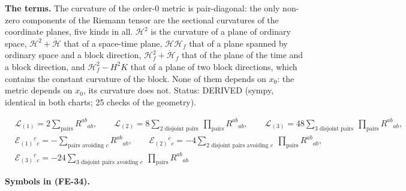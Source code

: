 \documentclass[
  10pt,
]{article}
\begin{document}
\textbf{The terms.} The curvature of the order-0 metric is
pair-diagonal: the only non-zero components of the Riemann tensor are
the sectional curvatures of the coordinate planes, five kinds in all.
\(\mathcal{H}^2\) is the curvature of a plane of ordinary space,
\(\mathcal{H}^2 + \dot{\mathcal{H}}\) that of a space-time plane,
\(\mathcal{H}\mathcal{H}_f\) that of a plane spanned by ordinary space
and a block direction, \(\mathcal{H}_f^2 + \dot{\mathcal{H}}_f\) that of
the plane of the time and a block direction, and
\(\mathcal{H}_f^2 - H^2K\) that of a plane of two block directions,
which contains the constant curvature of the block. None of them depends
on \(x_0\): the metric depends on \(x_0\), its curvature does not.
Status: DERIVED (sympy, identical in both charts; 25 checks of the
geometry).

\[
\begin{aligned}
&\mathcal{L}_{(1)} = 2\sum_{\text{pairs}}R^{ab}{}_{ab},\qquad
 \mathcal{L}_{(2)} = 8\sum_{\text{2 disjoint pairs}}\ \prod_{\text{pairs}}R^{ab}{}_{ab},\qquad
 \mathcal{L}_{(3)} = 48\sum_{\text{3 disjoint pairs}}\ \prod_{\text{pairs}}R^{ab}{}_{ab},\\
&\mathcal{E}_{(1)}{}^c{}_c = -\sum_{\text{pairs avoiding $c$}}R^{ab}{}_{ab},\qquad
 \mathcal{E}_{(2)}{}^c{}_c = -4\sum_{\text{2 disjoint pairs avoiding
 $c$}}\ \prod_{\text{pairs}}R^{ab}{}_{ab},\\
&\mathcal{E}_{(3)}{}^c{}_c = -24\sum_{\text{3 disjoint pairs avoiding $c$}}\ \prod_{\text{pairs}}R^{ab}{}_{ab}
\end{aligned} \tag{FE-34}
\]

\textbf{Symbols in (FE-34).}
\end{document}
